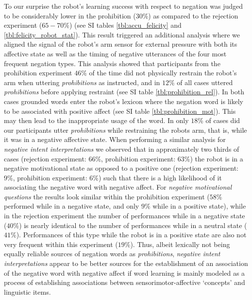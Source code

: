 To our surprise the robot's learning success with respect to negation was judged to be considerably lower in the prohibition ($30\%$) as compared to the
rejection experiment ($65-70\%$) (see SI tables \ref{tbl:accu_felicity} and \ref{tbl:felicity_robot_stat}). 
This result triggered an additional analysis where we aligned the signal of the robot's arm sensor for external pressure with both its affective state as
well as the timing of negative utterances of the four most frequent negation types. This analysis showed that participants from the prohibition experiment
$46\%$ of the time did not physically restrain the robot's arm when uttering \emph{prohibitions} as instructed, and in $12\%$ of all cases uttered
\emph{prohibitions} before applying restraint (see SI table \ref{tbl:prohibition_rel}). In both cases grounded words enter the robot's lexicon where the negation
word is likely to be associated with positive affect (see SI table \ref{tbl:prohibition_mot}). This may then lead to the inappropriate usage of the word. In
only $18\%$ of cases did our participants utter \emph{prohibitions} while restraining the robots arm, that is, while it was in a negative affective state.
When performing a similar analysis for \emph{negative intent interpretations} we observed that in approximately two thirds of cases (rejection experiment: $66\%$,
prohibition experiment: $63\%$) the robot is in a negative motivational state as opposed to a positive one (rejection experiment: $9\%$, prohibition experiment: $6\%$)
such that there is a high likelihood of it associating the negative word with negative affect. For \emph{negative motivational questions} the
results look similar within the prohibition experiment ($58\%$ performed while in a negative state, and only $9\%$ while in a positive state), while in the
rejection experiment the number of performances while in a negative state ($40\%$) is nearly identical to the number of performances while in a neutral state ($41\%$).
Performances of this type while the robot is in a positive state are also not very frequent within this experiment ($19\%$).
Thus, albeit lexically not being equally reliable sources of negation words as \emph{prohibitions}, \emph{negative intent interpretations} appear to be better sources
for the establishment of an association of the negative word with negative affect if word learning is mainly modeled as a process of establishing associations between
sensorimotor-affective `concepts' and linguistic items. 

